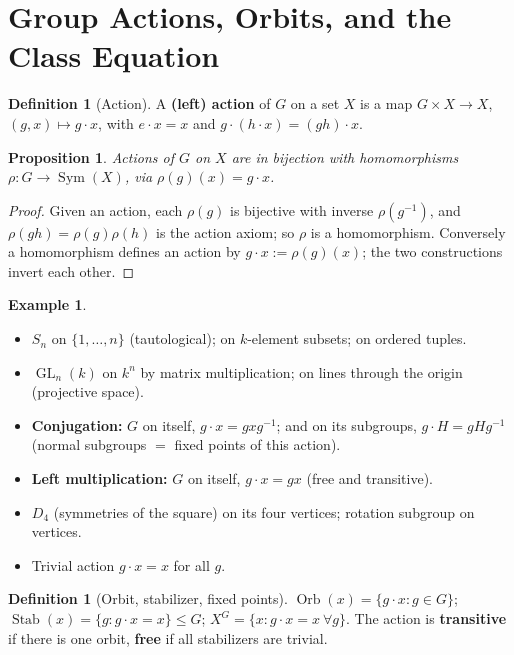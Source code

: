 \documentclass[11pt,a4paper]{article}
\newtheorem{proposition}[theorem]{Proposition}
\theoremstyle{definition}
\newtheorem{definition}[theorem]{Definition}
\newtheorem{example}[theorem]{Example}
\newcommand{\GL}{\operatorname{GL}}
\newcommand{\Sym}{\operatorname{Sym}}
\newcommand{\Orb}{\operatorname{Orb}}
\newcommand{\Stab}{\operatorname{Stab}}
\begin{document}
	\section{Group Actions, Orbits, and the Class Equation}
	
	\begin{definition}[Action]
		A \textbf{(left) action} of $G$ on a set $X$ is a map $G\times X\to X$, $(g,x)\mapsto g\cdot x$, with
		$e\cdot x=x$ and $g\cdot(h\cdot x)=(gh)\cdot x$.
	\end{definition}
	
	\begin{proposition}\label{prop:action-hom}
		Actions of $G$ on $X$ are in bijection with homomorphisms $\rho:G\to\Sym(X)$, via
		$\rho(g)(x)=g\cdot x$.
	\end{proposition}
	\begin{proof}
		Given an action, each $\rho(g)$ is bijective with inverse $\rho(g^{-1})$, and $\rho(gh)=\rho(g)\rho(h)$
		is the action axiom; so $\rho$ is a homomorphism. Conversely a homomorphism defines an action by
		$g\cdot x:=\rho(g)(x)$; the two constructions invert each other.
	\end{proof}
	
	\begin{example}\label{ex:actions}
		\begin{itemize}
			\item $S_n$ on $\{1,\dots,n\}$ (tautological); on $k$-element subsets; on ordered tuples.
			\item $\GL_n(k)$ on $k^n$ by matrix multiplication; on lines through the origin (projective space).
			\item \textbf{Conjugation:} $G$ on itself, $g\cdot x=gxg^{-1}$; and on its subgroups, $g\cdot H=gHg^{-1}$
			(normal subgroups $=$ fixed points of this action).
			\item \textbf{Left multiplication:} $G$ on itself, $g\cdot x=gx$ (free and transitive).
			\item $D_4$ (symmetries of the square) on its four vertices; rotation subgroup on vertices.
			\item Trivial action $g\cdot x=x$ for all $g$.
		\end{itemize}
	\end{example}
	
	\begin{definition}[Orbit, stabilizer, fixed points]
		$\Orb(x)=\{g\cdot x:g\in G\}$; $\Stab(x)=\{g:g\cdot x=x\}\le G$; $X^G=\{x:g\cdot x=x\ \forall g\}$.
		The action is \textbf{transitive} if there is one orbit, \textbf{free} if all stabilizers are trivial.
	\end{definition}
	
\end{document}
